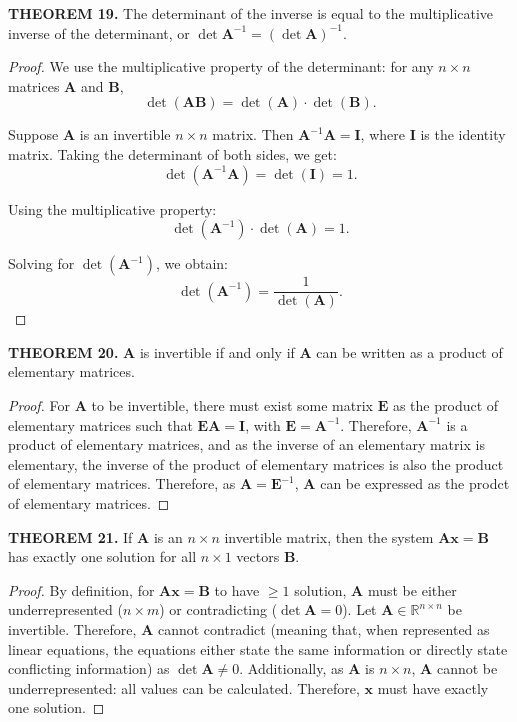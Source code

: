 \documentclass[12pt]{article}
\newcommand{\mat}[1]{\mathbf{#1}}
\newcommand{\theorem}[2]{\textbf{THEOREM #1.} #2}
\begin{document}
\theorem{19}{The determinant of the inverse is equal to the multiplicative inverse of the determinant, or $\det \mat{A}^{-1} = (\det \mat{A})^{-1}$.}

\begin{proof}
We use the multiplicative property of the determinant: for any \( n \times n \) matrices \( \mat{A} \) and \( \mat{B} \),
\[
\det(\mat{A} \mat{B}) = \det(\mat{A}) \cdot \det(\mat{B}).
\]

Suppose \( \mat{A} \) is an invertible \( n \times n \) matrix. Then \( \mat{A}^{-1} \mat{A} = \mat{I} \), where \( \mat{I} \) is the identity matrix. Taking the determinant of both sides, we get:
\[
\det(\mat{A}^{-1} \mat{A}) = \det(\mat{I}) = 1.
\]

Using the multiplicative property:
\[
\det(\mat{A}^{-1}) \cdot \det(\mat{A}) = 1.
\]

Solving for \( \det(\mat{A}^{-1}) \), we obtain:
\[
\det(\mat{A}^{-1}) = \frac{1}{\det(\mat{A})}.
\]

\end{proof}

\theorem{20}{$\mat{A}$ is invertible if and only if $\mat{A}$ can be written as a product of elementary matrices.}

\begin{proof}
For $\mat{A}$ to be invertible, there must exist some matrix $\mat{E}$ as the product of elementary matrices such that $\mat{EA = I}$, with $\mat{E} = \mat{A}^{-1}$. Therefore, $\mat{A}^{-1}$ is a product of elementary matrices, and as the inverse of an elementary matrix is elementary, the inverse of the product of elementary matrices is also the product of elementary matrices. Therefore, as $\mat{A} = \mat{E}^{-1}$, $\mat{A}$ can be expressed as the prodct of elementary matrices.
\end{proof}

\theorem{21}{If $\mat{A}$ is an $n \times n$ invertible matrix, then the system $\mat{Ax} = \mat{B}$ has exactly one solution for all $n \times 1$ vectors $\mat{B}$.}

\begin{proof}
By definition, for $\mat{Ax=B}$ to have $\ge 1$ solution, $\mat{A}$ must be either underrepresented ($n \times m$) or contradicting ($\det \mat{A} = 0$). Let $\mat{A} \in \mathbb{R}^{n \times n}$ be invertible. Therefore, $\mat{A}$ cannot contradict (meaning that, when represented as linear equations, the equations either state the same information or directly state conflicting information) as $\det \mat{A} \ne 0$. Additionally, as $\mat{A}$ is $n \times n$, $\mat{A}$ cannot be underrepresented: all values can be calculated. Therefore, $\mat{x}$ must have exactly one solution.
\end{proof}
\end{document}
